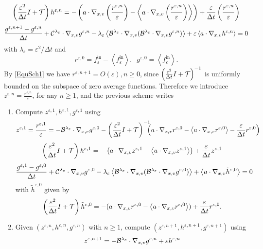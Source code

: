 \documentclass[12pt, a4paper]{article}
\newcommand{\ble}[0]{
{\cal B}^{\lambda _\varepsilon}}
\newcommand{\cle}[0]{
{\cal C}^{\lambda _\varepsilon}}
\newcommand{\eps}[0]{
\varepsilon}
\newcommand{\rez}[0]{
r ^{\varepsilon, 0}}
\newcommand{\reo}[0]{
r ^{\varepsilon, 1}}
\newcommand{\ren}[0]{
r ^{\varepsilon, n}}
\newcommand{\renpo}[0]{
r ^{\varepsilon, n + 1}}
\newcommand{\zeo}[0]{
z ^{\varepsilon, 1}}
\newcommand{\zen}[0]{
z ^{\varepsilon, n}}
\newcommand{\zenpo}[0]{
z ^{\varepsilon, n + 1}}
\newcommand{\hen}[0]{
h ^{\varepsilon, n}}
\newcommand{\heo}[0]{
h ^{\varepsilon, 1}}
\newcommand{\henpo}[0]{
h ^{\varepsilon, n + 1}}
\newcommand{\gez}[0]{
g ^{\varepsilon, 0}}
\newcommand{\geo}[0]{
g ^{\varepsilon, 1}}
\newcommand{\gen}[0]{
g ^{\varepsilon, n}}
\newcommand{\genpo}[0]{
g ^{\varepsilon, n + 1}}
\newcommand{\fine}[0]{
f ^{\mathrm{in}}_{\varepsilon}}
\newcommand{\nxv}[0]{
\nabla_{x,v}}
\newcommand{\ave}[1]{
\left \langle #1 \right \rangle }
\begin{document}
{\begin{equation}
\left (  \frac{\eps ^2}{\Delta t}I + {\cal T}\right ) \hen = - \left ( a \cdot \nxv \left ( \frac{\ren }{\eps } \right )- \ave{a \cdot \nxv \left ( \frac{\ren }{\eps }\right ) } \right ) + \frac{\eps}{\Delta t} \left ( \frac{\ren}{\eps} \right )
\end{equation}
\begin{equation}
\label{EquSch3} \frac{\genpo - \gen}{\Delta t} + \cle \cdot \nxv \gen - \lambda _\eps \ave{\ble \cdot \nxv ( \ble \cdot \nxv \gen )} + \eps \ave{a \cdot \nxv \hen} = 0
\end{equation}
with $\lambda _\eps = \eps ^2 /\Delta t$ and
\begin{equation}
\label{EquSch4}
\rez = \fine - \ave{\fine},\;\;\gez = \ave{\fine}.
\end{equation}
By \eqref{EquSch1} we have $\renpo = O(\eps), n \geq 0$, since $\left ( \frac{\eps ^2}{\Delta t} I + {\cal T} \right ) ^{-1}$ is uniformly bounded on the subspace of zero average functions. Therefore we introduce $\zen = \frac{\ren}{\eps}$, for any $n \geq 1$, and the previous scheme writes
\begin{enumerate}
\item Compute $\zeo, \heo, \geo$ using
\begin{align}
\label{EquSch5}
\zeo  = \frac{\reo}{\eps} = - \ble \cdot \nxv \gez - \left (  \frac{\eps ^2}{\Delta t}I + {\cal T}\right )^{-1} \!\!\!\!\left ( a \cdot \nxv \rez - \ave{a \cdot \nxv \rez } - \frac{\eps}{\Delta t}\rez \right )
\end{align}
\begin{align}
\label{EquSch6}
\left (  \frac{\eps ^2}{\Delta t}I + {\cal T}\right )\heo = 
- \left ( 
a \cdot \nxv \zeo- \ave{a \cdot \nxv \zeo} 
\right ) + 
\frac{\eps}{\Delta t} 
\zeo
\end{align}
\begin{align}
\label{EquSch7}
\frac{\geo - \gez}{\Delta t} + \cle \cdot \nxv \gez - \lambda _\eps \ave{\ble \cdot \nxv ( \ble \cdot \nxv \gez )} +  \ave{a \cdot \nxv \tilde{h}^{\eps, 0}} = 0
\end{align}
with $\tilde{h}^{\eps, 0}$ given by
\[
\left (  \frac{\eps ^2}{\Delta t}I + {\cal T}\right )\tilde{h}^{\eps, 0} = - ( a \cdot \nxv \rez - \ave{a \cdot \nxv \rez}) + \frac{\eps}{\Delta t} \rez.
\]
\item Given $(\zen, \hen, \gen)$ with $n \geq 1$, compute $(\zenpo, \henpo, \genpo)$ using
\begin{equation}
\label{EquSch8}
\zenpo = - \ble \cdot \nxv \gen + \eps \hen
\end{equation}

\end{enumerate}}
\end{document}
